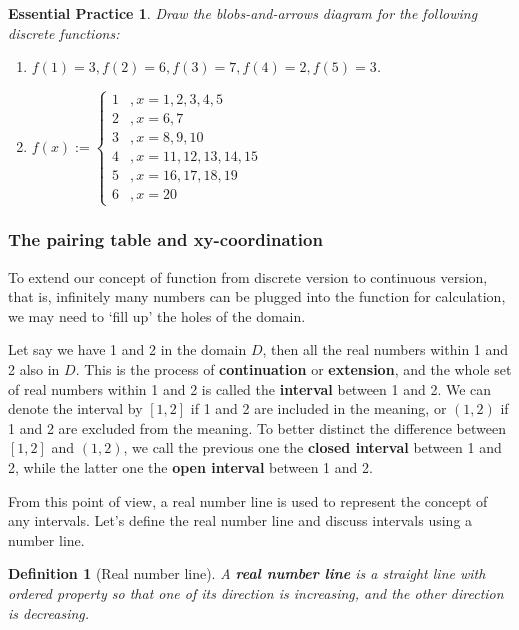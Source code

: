 \documentclass[12pt]{article}
\newtheorem{definition}{Definition}[section]
\newtheorem{exercise}{Essential Practice}[subsubsection]
\begin{document}
    \begin{exercise}
        Draw the blobs-and-arrows diagram for the following discrete functions:\begin{enumerate}
            \item $f(1)=3, f(2)=6, f(3)=7, f(4)=2, f(5)=3$.
            \item $f(x):=\begin{cases}
                1 &,x=1,2,3,4,5\\
                2 &,x=6,7\\
                3 &,x=8,9,10\\
                4 &,x=11,12,13,14,15\\
                5 &,x=16,17,18,19\\
                6 &,x=20
            \end{cases}$
        \end{enumerate}
    \end{exercise}

    \subsubsection{The pairing table and xy-coordination}

    To extend our concept of function from discrete version to continuous version, that is, infinitely many numbers can be plugged into the function for calculation, we may need to `fill up' the holes of the domain. 
    
    Let say we have 1 and 2 in the domain $D$, then all the real numbers within 1 and 2 also in $D$. This is the process of \textbf{continuation} or \textbf{extension}, and the whole set of real numbers within 1 and 2 is called the \textbf{interval} between 1 and 2. We can denote the interval by $[1,2]$ if 1 and 2 are included in the meaning, or $(1,2)$ if 1 and 2 are excluded from the meaning. To better distinct the difference between $[1,2]$ and $(1,2)$, we call the previous one the \textbf{closed interval} between 1 and 2, while the latter one the \textbf{open interval} between 1 and 2.

    From this point of view, a real number line is used to represent the concept of any intervals. Let's define the real number line and discuss intervals using a number line.

    \begin{definition}[Real number line]
        A \textbf{real number line} is a straight line with ordered property so that one of its direction is increasing, and the other direction is decreasing.
    \end{definition}
\end{document}
